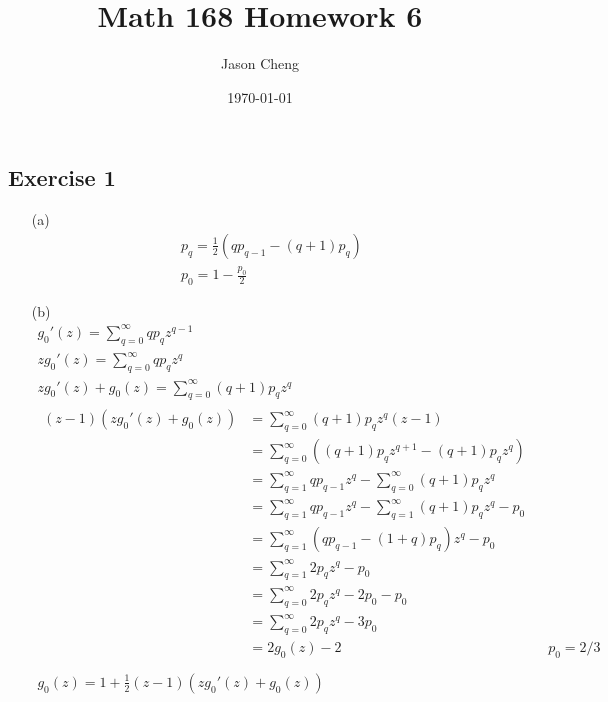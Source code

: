 \documentclass{article}
\title{Math 168 Homework 6}
\author{Jason Cheng}
\date{\today}
\begin{document}
\maketitle

\subsection*{Exercise 1}

\begin{enumerate}
  \item[(a)]
  \begin{gather*}
    p_q = \frac{1}{2} (q p_{q - 1} - (q + 1) p_q) \\
    p_0 = 1 - \frac{p_0}{2}
  \end{gather*}

  \item[(b)]
  \begin{gather*}
    g_0'(z) = \sum_{q = 0}^{\infty} q p_q z^{q - 1} \\
    zg_0'(z) = \sum_{q = 0}^{\infty} q p_q z^q \\
    zg_0'(z) + g_0(z) = \sum_{q = 0}^{\infty} (q + 1) p_q z^q \\
    \begin{aligned}
      (z - 1)(zg_0'(z) + g_0(z)) &= \sum_{q = 0}^{\infty} (q + 1) p_q z^q (z - 1) \\
      &= \sum_{q = 0}^{\infty} ((q + 1) p_q z^{q + 1} - (q + 1) p_q z^q) \\
      &= \sum_{q = 1}^{\infty} q p_{q - 1} z^q - \sum_{q = 0}^{\infty} (q + 1) p_q z^q \\
      &= \sum_{q = 1}^{\infty} q p_{q - 1} z^q - \sum_{q = 1}^{\infty} (q + 1) p_q z^q - p_0 \\
      &= \sum_{q = 1}^{\infty} (q p_{q - 1} - (1 + q) p_q) z^q - p_0 \\
      &= \sum_{q = 1}^{\infty} 2 p_q z^q - p_0 \\
      &= \sum_{q = 0}^{\infty} 2 p_q z^q - 2p_0 - p_0 \\
      &= \sum_{q = 0}^{\infty} 2 p_q z^q - 3p_0 \\
      &= 2g_0(z) - 2 && p_0 = 2 / 3 \\
    \end{aligned} \\
    \boxed{g_0(z) = 1 + \frac{1}{2} (z - 1)(z g_0'(z) + g_0(z))}
  \end{gather*}


\end{enumerate}
\end{document}
